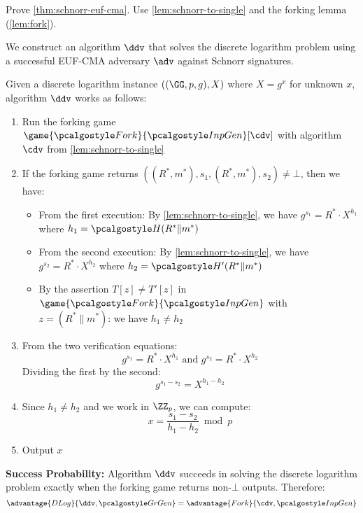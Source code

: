\begin{exercise}\label{ex:schnorr-euf-cma}
  Prove \autoref{thm:schnorr-euf-cma}. Use \autoref{lem:schnorr-to-single} and the forking lemma (\autoref{lem:fork}).
\end{exercise}

\ifsolutions
\begin{mysolution}
  We construct an algorithm $\ddv$ that solves the discrete logarithm problem using a successful EUF-CMA adversary $\adv$ against Schnorr signatures.
  
  Given a discrete logarithm instance $((\GG, p, g), X)$ where $X = g^x$ for unknown $x$, algorithm $\ddv$ works as follows:
  \begin{enumerate}
    \item Run the forking game $\game{\algo{Fork}}{\algo{InpGen}}[\cdv]$ with algorithm $\cdv$ from \autoref{lem:schnorr-to-single}
    \item If the forking game returns $((R^*, m^*), s_1, (R^*, m^*), s_2) \neq \bot$, then we have:
    \begin{itemize}
      \item From the first execution: By \autoref{lem:schnorr-to-single}, we have $g^{s_1} = R^* \cdot X^{h_1}$ where $h_1 = \algo{H}(R^* \| m^*)$
      \item From the second execution: By \autoref{lem:schnorr-to-single}, we have $g^{s_2} = R^* \cdot X^{h_2}$ where $h_2 = \algo{H}'(R^* \| m^*)$
      \item By the assertion $T[z] \neq T'[z]$ in $\game{\algo{Fork}}{\algo{InpGen}}$ with $z = (R^* \| m^*)$: we have $h_1 \neq h_2$
    \end{itemize}
    \item From the two verification equations:
    \[
      g^{s_1} = R^* \cdot X^{h_1} \text{ and } g^{s_2} = R^* \cdot X^{h_2}
    \]
    Dividing the first by the second:
    \[
      g^{s_1 - s_2} = X^{h_1 - h_2}
    \]
    \item Since $h_1 \neq h_2$ and we work in $\ZZ_p$, we can compute:
    \[
      x = \frac{s_1 - s_2}{h_1 - h_2} \bmod p
    \]
    \item Output $x$
  \end{enumerate}
  
  \textbf{Success Probability:} Algorithm $\ddv$ succeeds in solving the discrete logarithm problem exactly when the forking game returns non-$\bot$ outputs. Therefore:
  \[
    \advantage{DLog}{\ddv, \grgen} = \advantage{Fork}{\cdv, \algo{InpGen}}
  \]
  

\end{mysolution}
